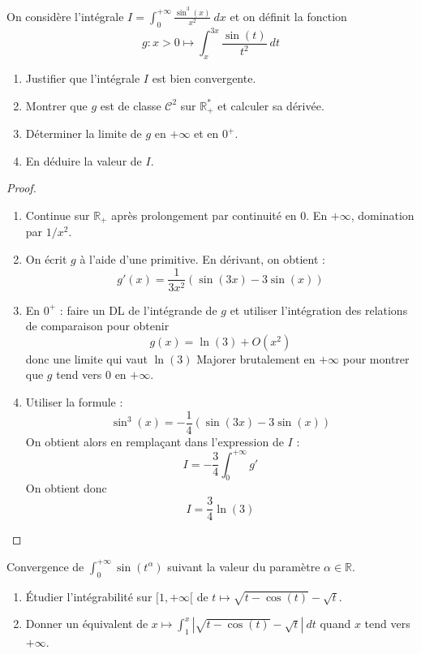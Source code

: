 \documentclass[french,a4paper]{article}
\newcommand{\R}{\mathbb{R}}
\newcommand{\st}{^*}
\theoremstyle{plain}
\theoremstyle{definition}
\theoremstyle{remark}
\begin{document}
\begin{ex}[Moulin.IG.56]{}
	On considère l'intégrale $I=\displaystyle\int_{0}^{+\infty}\frac{\sin^3(x)}{x^2}\ dx$ et on définit la fonction $$g:x>0\mapsto\int_{x}^{3x}\frac{\sin(t)}{t^2}\ dt$$
	\begin{enumerate}
		\item Justifier que l'intégrale $I$ est bien convergente. 
		\item Montrer que $g$ est de classe $\mathcal{C}^2$ sur $\R_+\st$ et calculer sa dérivée.
		\item Déterminer la limite de $g$ en $+\infty$ et en $0^+$.
		\item En déduire la valeur de $I$.
	\end{enumerate}
\end{ex}
\begin{proof}
	\begin{enumerate}
		\item Continue sur $\R_+$ après prolongement par continuité en $0$. En $+\infty$, domination par $1/x^2$.
		\item On écrit $g$ à l'aide d'une primitive. En dérivant, on obtient : $$g'(x)=\frac{1}{3x^2}(\sin(3x)-3\sin(x))$$
		\item En $0^+$ : faire un DL de l'intégrande de $g$ et utiliser l'intégration des relations de comparaison pour obtenir $$g(x)=\ln(3)+O\left(x^2\right)$$ donc une limite qui vaut $\ln(3)$ Majorer brutalement en $+\infty$ pour montrer que $g$ tend vers $0$ en $+\infty$.
		\item Utiliser la formule : $$\sin^3(x)=-\frac{1}{4}(\sin(3x)-3\sin(x))$$ On obtient alors en remplaçant dans l'expression de $I$ : $$I=-\frac{3}{4}\int_{0}^{+\infty} g'$$ On obtient donc $$I=\frac{3}{4}\ln(3)$$
	\end{enumerate}
\end{proof}

\begin{ex}[Moulin.IG.57]{}
	Convergence de $\displaystyle\int_{0}^{+\infty}\sin(t^\alpha)$ suivant la valeur du paramètre $\alpha\in\R$.
\end{ex}

\begin{ex}[Moulin.IG.58]{}
	\begin{enumerate}
		\item Étudier l'intégrabilité sur $[1,+\infty[$ de $t\mapsto\sqrt{t-\cos(t)}-\sqrt{t}$.
		\item Donner un équivalent de $x\mapsto\displaystyle\int_{1}^{x}\left\lvert\sqrt{t-\cos(t)}-\sqrt{t}\right\rvert\ dt$ quand $x$ tend vers $+\infty$.
	\end{enumerate}
\end{ex}
\end{document}
